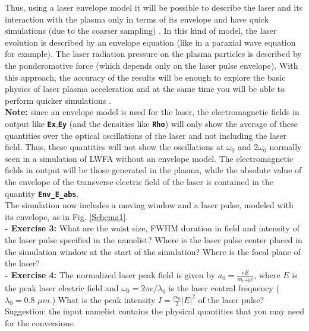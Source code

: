 \documentclass[a4paper,12pt]{extarticle}
\newcommand{\commandline}[1]{\texttt{\textbf{#1}}}
\begin{document}
Thus, using a laser envelope model it will be possible to describe the laser and its interaction with the plasma only in terms of its envelope and have quick simulations (due to the coarser sampling) \cite{Mora1997,Gordon2000,Cowan2011,Massimo2019,Terzani2019}. In this kind of model, the laser evolution is described by an envelope equation (like in a paraxial wave equation for example). The laser radiation pressure on the plasma particles is described by the ponderomotive force (which depends only on the laser pulse envelope). With this approach, the accuracy of the results will be enough to explore the basic physics of laser plasma acceleration and at the same time you will be able to perform quicker simulations \cite{Massimo2019,Terzani2019,Massimo2019cylindrical}.  \\ 

\textbf{ Note:} since an envelope model is used for the laser,  the electromagnetic fields in output like \commandline{Ex},\commandline{Ey} (and the densities like \commandline{Rho}) will only show the average of these quantities over the optical oscillations of the laser and not including the laser field. Thus, these quantities will not show the oscillations at $\omega_0$ and $2\omega_0$ normally seen in a simulation of LWFA without an envelope model. The electromagnetic fields in output will be those generated in the plasma, while the absolute value of the envelope of the transverse electric field of the laser is contained in the quantity \commandline{Env\_E\_abs}. \\

The simulation now includes a moving window and a laser pulse, modeled with its envelope, as in Fig. \ref{Schema1}.\\

\textbf{ - Exercise 3:} What are the waist size, FWHM duration in field and intensity of the laser pulse specified in the namelist? Where is the laser pulse center placed in the simulation window at the start of the simulation? Where is the focal plane of the laser?\\

\textbf{ - Exercise 4:} The normalized laser peak field is given by $a_0=\frac{eE}{m_e\omega_0 c}$, where $E$ is the peak laser electric field and $\omega_0=2\pi c/\lambda_0$ is the laser central frequency ($\lambda_0=0.8$ $\mu m$.) What is the peak intensity $I=\frac{c\epsilon_0}{2}|E|^2$ of the laser pulse? Suggestion: the input namelist contains the physical quantities that you may need for the conversions.\\
\end{document}
